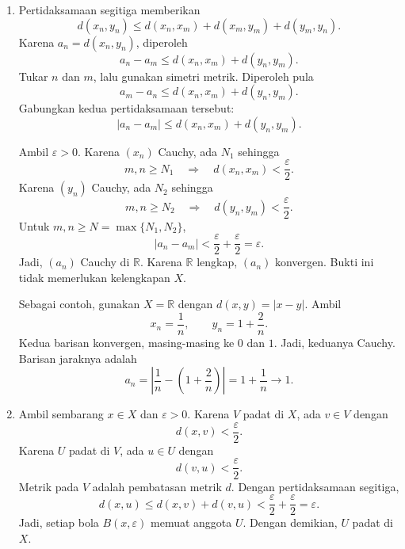 \documentclass[11pt,a4paper]{article}
\newcommand{\R}{\mathbb{R}}
\begin{document}
\begin{enumerate}[itemsep=12pt,parsep=5pt]
        Ambil $\varepsilon>0$.
        Untuk setiap $j$, pilih $N_j$ sehingga
        \[
          k\ge N_j\quad\Longrightarrow\quad
          |\xi_j^{(k)}-\xi_j|<\varepsilon.
        \]
        Banyaknya koordinat berhingga.
        Jadi, kita dapat memilih $N=\max\{N_1,\ldots,N_n\}$.
        Untuk $k\ge N$, semua selisih koordinat kurang dari $\varepsilon$.
        Maka,
        \[
          d(x^{(k)},x)=\max_{1\le j\le n}|\xi_j^{(k)}-\xi_j|
          <\varepsilon.
        \]
        Jadi, $x^{(k)}\to x\in X$.
        Setiap barisan Cauchy di $X$ konvergen di $X$.
        Dengan demikian, $(X,d)$ lengkap.

  \item Pertidaksamaan segitiga memberikan
        \[
          d(x_n,y_n)\le d(x_n,x_m)+d(x_m,y_m)+d(y_m,y_n).
        \]
        Karena $a_n=d(x_n,y_n)$, diperoleh
        \[
          a_n-a_m\le d(x_n,x_m)+d(y_n,y_m).
        \]
        Tukar $n$ dan $m$, lalu gunakan simetri metrik.
        Diperoleh pula
        \[
          a_m-a_n\le d(x_n,x_m)+d(y_n,y_m).
        \]
        Gabungkan kedua pertidaksamaan tersebut:
        \[
          |a_n-a_m|\le d(x_n,x_m)+d(y_n,y_m).
        \]

        Ambil $\varepsilon>0$.
        Karena $(x_n)$ Cauchy, ada $N_1$ sehingga
        \[
          m,n\ge N_1\quad\Longrightarrow\quad
          d(x_n,x_m)<\frac{\varepsilon}{2}.
        \]
        Karena $(y_n)$ Cauchy, ada $N_2$ sehingga
        \[
          m,n\ge N_2\quad\Longrightarrow\quad
          d(y_n,y_m)<\frac{\varepsilon}{2}.
        \]
        Untuk $m,n\ge N=\max\{N_1,N_2\}$,
        \[
          |a_n-a_m|<\frac{\varepsilon}{2}+\frac{\varepsilon}{2}
          =\varepsilon.
        \]
        Jadi, $(a_n)$ Cauchy di $\R$.
        Karena $\R$ lengkap, $(a_n)$ konvergen.
        Bukti ini tidak memerlukan kelengkapan $X$.

        Sebagai contoh, gunakan $X=\R$ dengan $d(x,y)=|x-y|$.
        Ambil
        \[
          x_n=\frac{1}{n},\qquad y_n=1+\frac{2}{n}.
        \]
        Kedua barisan konvergen, masing-masing ke $0$ dan $1$.
        Jadi, keduanya Cauchy.
        Barisan jaraknya adalah
        \[
          a_n=\left|\frac{1}{n}-\left(1+\frac{2}{n}\right)\right|
          =1+\frac{1}{n}\longrightarrow1.
        \]

  \item Ambil sembarang $x\in X$ dan $\varepsilon>0$.
        Karena $V$ padat di $X$, ada $v\in V$ dengan
        \[
          d(x,v)<\frac{\varepsilon}{2}.
        \]
        Karena $U$ padat di $V$, ada $u\in U$ dengan
        \[
          d(v,u)<\frac{\varepsilon}{2}.
        \]
        Metrik pada $V$ adalah pembatasan metrik $d$.
        Dengan pertidaksamaan segitiga,
        \[
          d(x,u)\le d(x,v)+d(v,u)
          <\frac{\varepsilon}{2}+\frac{\varepsilon}{2}=\varepsilon.
        \]
        Jadi, setiap bola $B(x,\varepsilon)$ memuat anggota $U$.
        Dengan demikian, $U$ padat di $X$.


\end{enumerate}
\end{document}
